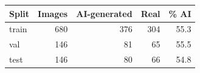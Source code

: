 \begin{tabular}{lrrrr}
\toprule
\textbf{Split} & \textbf{Images} & \textbf{AI-generated} & \textbf{Real} & \textbf{\% AI} \\
\midrule
train & 680 & 376 & 304 & 55.3 \\
val & 146 & 81 & 65 & 55.5 \\
test & 146 & 80 & 66 & 54.8 \\
\bottomrule
\end{tabular}
